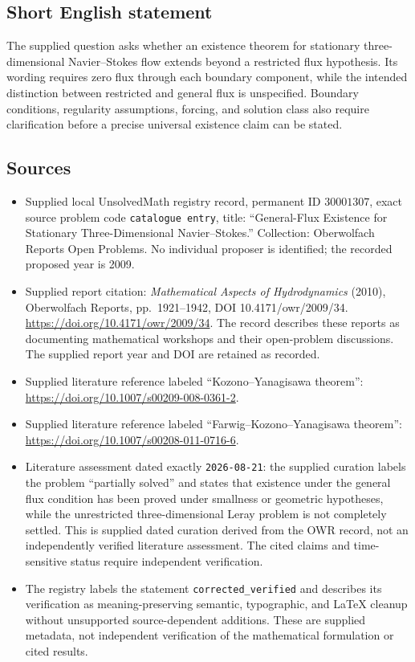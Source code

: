 \documentclass[11pt]{article}
\begin{document}
\subsection{Short English statement}
The supplied question asks whether an existence theorem for stationary three-dimensional Navier--Stokes flow extends beyond a restricted flux hypothesis. Its wording requires zero flux through each boundary component, while the intended distinction between restricted and general flux is unspecified. Boundary conditions, regularity assumptions, forcing, and solution class also require clarification before a precise universal existence claim can be stated.
\subsection{Sources}
\begin{itemize}
\item Supplied local UnsolvedMath registry record, permanent ID \(30001307\), exact source problem code \texttt{catalogue entry}, title: ``General-Flux Existence for Stationary Three-Dimensional Navier--Stokes.'' Collection: Oberwolfach Reports Open Problems. No individual proposer is identified; the recorded proposed year is 2009.
\item Supplied report citation: \emph{Mathematical Aspects of Hydrodynamics} (2010), Oberwolfach Reports, pp.\ 1921--1942, DOI 10.4171/owr/2009/34. \url{https://doi.org/10.4171/owr/2009/34}. The record describes these reports as documenting mathematical workshops and their open-problem discussions. The supplied report year and DOI are retained as recorded.
\item Supplied literature reference labeled ``Kozono--Yanagisawa theorem'': \url{https://doi.org/10.1007/s00209-008-0361-2}.
\item Supplied literature reference labeled ``Farwig--Kozono--Yanagisawa theorem'': \url{https://doi.org/10.1007/s00208-011-0716-6}.
\item Literature assessment dated exactly \texttt{2026-08-21}: the supplied curation labels the problem ``partially solved'' and states that existence under the general flux condition has been proved under smallness or geometric hypotheses, while the unrestricted three-dimensional Leray problem is not completely settled. This is supplied dated curation derived from the OWR record, not an independently verified literature assessment. The cited claims and time-sensitive status require independent verification.
\item The registry labels the statement \texttt{corrected\_verified} and describes its verification as meaning-preserving semantic, typographic, and LaTeX cleanup without unsupported source-dependent additions. These are supplied metadata, not independent verification of the mathematical formulation or cited results.
\end{itemize}
\end{document}
